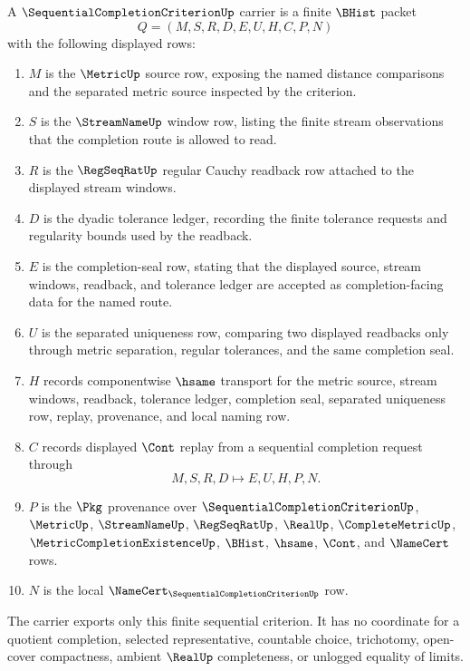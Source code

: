 \begin{definition}\label{def:sequential-completion-criterion-carrier}
A $\SequentialCompletionCriterionUp$ carrier is a finite $\BHist$ packet
$$
Q=(M,S,R,D,E,U,H,C,P,N)
$$
with the following displayed rows:
\begin{enumerate}
\item $M$ is the $\MetricUp$ source row, exposing the named distance comparisons and the separated metric source inspected by the criterion.
\item $S$ is the $\StreamNameUp$ window row, listing the finite stream observations that the completion route is allowed to read.
\item $R$ is the $\RegSeqRatUp$ regular Cauchy readback row attached to the displayed stream windows.
\item $D$ is the dyadic tolerance ledger, recording the finite tolerance requests and regularity bounds used by the readback.
\item $E$ is the completion-seal row, stating that the displayed source, stream windows, readback, and tolerance ledger are accepted as completion-facing data for the named route.
\item $U$ is the separated uniqueness row, comparing two displayed readbacks only through metric separation, regular tolerances, and the same completion seal.
\item $H$ records componentwise $\hsame$ transport for the metric source, stream windows, readback, tolerance ledger, completion seal, separated uniqueness row, replay, provenance, and local naming row.
\item $C$ records displayed $\Cont$ replay from a sequential completion request through
$$
M,S,R,D \longmapsto E,U,H,P,N .
$$
\item $P$ is the $\Pkg$ provenance over $\SequentialCompletionCriterionUp$, $\MetricUp$, $\StreamNameUp$, $\RegSeqRatUp$, $\RealUp$, $\CompleteMetricUp$, $\MetricCompletionExistenceUp$, $\BHist$, $\hsame$, $\Cont$, and $\NameCert$ rows.
\item $N$ is the local $\NameCert_{\SequentialCompletionCriterionUp}$ row.
\end{enumerate}
The carrier exports only this finite sequential criterion. It has no coordinate for a quotient completion, selected representative, countable choice, trichotomy, open-cover compactness, ambient $\RealUp$ completeness, or unlogged equality of limits.
\end{definition}

